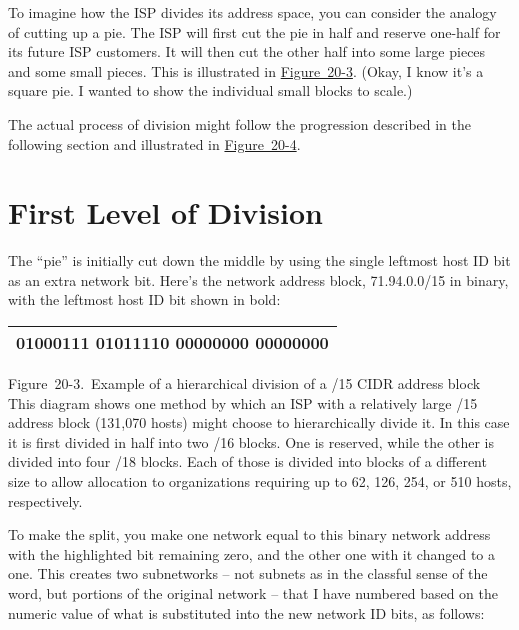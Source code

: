To imagine how the ISP divides its address space, you can consider the
analogy of cutting up a pie. The ISP will first cut the pie in half and
reserve one-half for its future ISP customers. It will then cut the
other half into some large pieces and some small pieces. This is
illustrated in
\protect\hyperlink{ch20s04.htmlux5cux23example_of_a_hierarchical_division_of_a_}{Figure~20-3}.
(Okay, I know it's a square pie. I wanted to show the individual small
blocks to scale.)

The actual process of division might follow the progression described in
the following section and illustrated in
\protect\hyperlink{ch20s04.htmlux5cux23hierarchical_address_division_using_cidr}{Figure~20-4}.

\section{First Level of Division}

The ``pie'' is initially cut down the middle by using the single leftmost
host ID bit as an extra network bit. Here's the network address block,
71.94.0.0/15 in binary, with the leftmost host ID bit shown in bold:

\begin{longtable}[]{@{}l@{}}
\toprule
\endhead
01000111 0101111{\textbf{0}} 00000000 00000000\tabularnewline
\bottomrule
\end{longtable}

\protect\hypertarget{ch20s04.htmlux5cux23example_of_a_hierarchical_division_of_a_}{}{}

\protect\hypertarget{ch20s04.htmlux5cux23I_mediaobject6_d1e22480}{}{}

Figure~20-3.~Example of a hierarchical division of a /15 CIDR address
block This diagram shows one method by which an ISP with a relatively
large /15 address block (131,070 hosts) might choose to hierarchically
divide it. In this case it is first divided in half into two /16 blocks.
One is reserved, while the other is divided into four /18 blocks. Each
of those is divided into blocks of a different size to allow allocation
to organizations requiring up to 62, 126, 254, or 510 hosts,
respectively.

To make the split, you make one network equal to this binary network
address with the highlighted bit remaining zero, and the other one with
it changed to a one. This creates two subnetworks -- not subnets as in
the classful sense of the word, but portions of the original
network -- that I have numbered based on the numeric value of what is
substituted into the new network ID bits, as follows:

